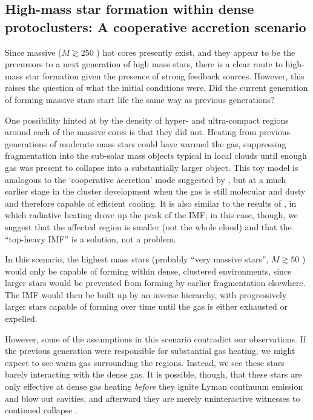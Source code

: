 \documentclass{emulateapj}
\begin{document}
\subsection{High-mass star formation within dense protoclusters: A cooperative
accretion scenario}
Since massive ($M\gtrsim250$ \msun) hot cores presently exist, and they
appear to be the precursors to a next generation of high mass stars, there
is a clear route to high-mass star formation given the presence of 
strong feedback sources.   However, this raises the question of what
the initial conditions were.  Did the
current generation of forming massive stars start life the same way
as previous generations?

One possibility hinted at by the density of hyper- and ultra-compact \hii
regions around each of the massive cores is that they did not.  Heating from
previous generations of moderate mass stars could have warmed the gas,
suppressing fragmentation into the sub-solar mass objects typical in local
clouds until enough gas was present to collapse into a substantially larger
object.  This toy model is analogous to the `cooperative accretion' mode
suggested by \citet{Zinnecker2007a}, but at a much earlier stage in the cluster
development when the gas is still molecular and dusty and therefore capable of
efficient cooling.  It is also similar to the results of \citet{Krumholz2011a},
in which radiative heating drove up the peak of the IMF; in this case, though,
we suggest that the affected region is smaller (not the whole cloud) and that
the ``top-heavy IMF'' is a solution, not a problem.

In this scenario, the highest mass stars (probably ``very massive stars'',
$M\gtrsim50$ \msun) would only be capable of forming within dense, clustered
environments, since larger stars would be prevented from forming by earlier
fragmentation elsewhere.  The IMF would then be built up by an inverse
hierarchy, with progressively larger stars capable of forming over time until
the gas is either exhausted \citep{Ginsburg2016b} or expelled.

However, some of the assumptions in this scenario contradict our observations.
If the previous generation were responsible for substantial gas heating, we
might expect to see warm gas surrounding the \hchii regions.  Instead, we see
these stars barely interacting with the dense gas.  It is possible, though,
that these stars are only effective at dense gas heating \emph{before} they ignite
Lyman continuum emission and blow out cavities, and afterward they are merely
uninteractive witnesses to continued collapse \citep{Peters2010c}.
\end{document}
